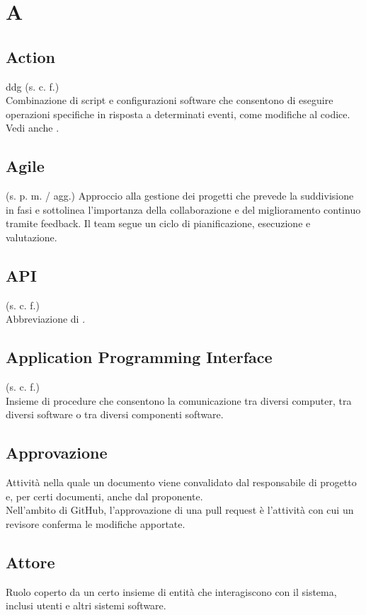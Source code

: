 \section{A}
    \subsection{Action}
    ddg
    (s. c. f.)\\
    Combinazione di script e configurazioni software che consentono di eseguire operazioni 
    specifiche in risposta a determinati eventi, come modifiche al codice.
    Vedi anche .
    \subsection{Agile}
    (s. p. m. / agg.)
    Approccio alla gestione dei progetti che prevede la suddivisione in fasi e sottolinea 
    l'importanza della collaborazione e del miglioramento continuo tramite feedback. 
    Il team segue un ciclo di pianificazione, esecuzione e valutazione.
    \subsection{API}
    (s. c. f.)\\
    Abbreviazione di .
    \subsection{Application Programming Interface}
    \label{Application Programming Interface}
    (s. c. f.)\\
    Insieme di procedure che consentono la comunicazione tra diversi computer, tra diversi 
    software o tra diversi componenti software.
    \subsection{Approvazione}
    Attività nella quale un documento viene convalidato dal responsabile di progetto e, 
    per certi documenti, anche dal proponente. \\
    Nell'ambito di GitHub, l'approvazione di una pull request è l'attività con cui un 
    revisore conferma le modifiche apportate.
    \subsection{Attore}
    Ruolo coperto da un certo insieme di entità che interagiscono con il sistema, 
    inclusi utenti e altri sistemi software.
\pagebreak
